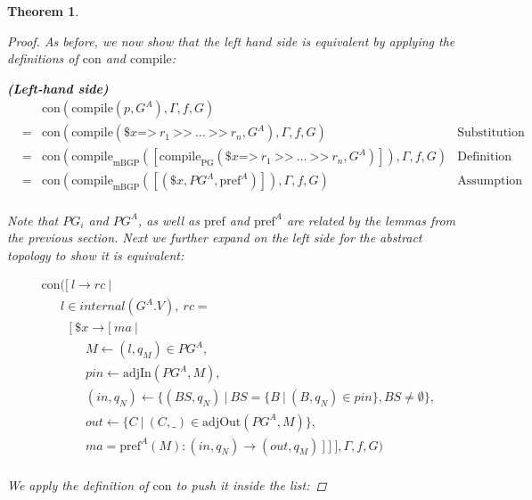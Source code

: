 \documentclass[twocolumn, openany]{sig-alternate-10pt}
\newcommand{\Prefer}{\texttt{>>}}
\newcommand{\Path}{\texttt{=>}}
\newcommand{\Con}{\mathrm{con}}
\newcommand{\CompilePg}{\ensuremath{\mathrm{compile}_\mathrm{PG}}}
\newcommand{\CompileMbgp}{\ensuremath{\mathrm{compile}_\mathrm{mBGP}}}
\newcommand{\Compile}{\ensuremath{\mathrm{compile}}}
\newcommand{\Pref}{\ensuremath{\mathrm{pref}}}
\newtheorem{thm}{Theorem}
\begin{document}
\begin{thm}
\begin{proof}
    \noindent
    As before, we now show that the left hand side is equivalent by applying the definitions of $\Con$ and $\Compile$:

    \vspace{1em}
    \noindent
    \textbf{(Left-hand side)}
    \[
    \begin{array}{llll}
      & & \Con(\Compile(p,G^A),\Gamma,f,G) \\
      &=& \Con(\Compile(\$x \Path~ r_1 ~\Prefer~ \ldots ~\Prefer~ r_n,G^A),\Gamma,f,G)
            & \text{Substitution} \\
      &=& \Con(\CompileMbgp([\CompilePg(\$x \Path~ r_1 ~\Prefer~ \ldots ~\Prefer~ r_n,G^A)]),\Gamma,f,G)
            & \text{Definition of Compile} \\
      &=& \Con(\CompileMbgp([(\$x,PG^A,\Pref^A)]),\Gamma,f,G)
            & \text{Assumption}\\
    \end{array}
    \]

  \noindent
  Note that $PG_i$ and $PG^A$, as well as $\Pref$ and $\Pref^A$ are related by the lemmas from the previous section. Next we further expand on the left side for the abstract topology to show it is equivalent:

  \[ \begin{array}{l}
     ~~~~~ \Con([~ l \rightarrow rc ~\vert~ \\
     ~~~~~~~~~~~~ l \in internal(G^A.V), ~rc =  \\
     ~~~~~~~~~~~~~~~ [~ \$x \rightarrow [~ ma ~\vert~ \\
     ~~~~~~~~~~~~~~~~~~~~~ M \leftarrow (l,q_M) \in PG^A, \\
     ~~~~~~~~~~~~~~~~~~~~~ pin \leftarrow \text{adjIn}(PG^A,M), \\
     ~~~~~~~~~~~~~~~~~~~~~ (in,q_N) \leftarrow \{ (BS,q_N) ~\vert~ BS=\{B ~\vert~ (B,q_N) \in pin \}, BS \neq \emptyset \}, \\
     ~~~~~~~~~~~~~~~~~~~~~ out \leftarrow \{ C ~\vert~ (C,\_) \in \text{adjOut}(PG^A,M) \}, \\
     ~~~~~~~~~~~~~~~~~~~~~ ma = \Pref^A(M) : (in,q_N) \rightarrow (out,q_M) ~] ~] ~], \Gamma, f, G) \\
  \end{array} \]%

  \noindent
  We apply the definition of $\Con$ to push it inside the list:


\end{proof}
\end{thm}
\end{document}
